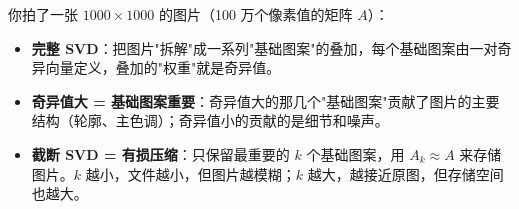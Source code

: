 \documentclass[a4paper,11pt]{ctexart}
\begin{document}
\begin{metaphorbox}
    你拍了一张 $1000 \times 1000$ 的图片（100 万个像素值的矩阵 $A$）：

    \begin{itemize}
        \item \textbf{完整 SVD}：把图片"拆解"成一系列"基础图案"的叠加，每个基础图案由一对奇异向量定义，叠加的"权重"就是奇异值。
        \item \textbf{奇异值大 = 基础图案重要}：奇异值大的那几个"基础图案"贡献了图片的主要结构（轮廓、主色调）；奇异值小的贡献的是细节和噪声。
        \item \textbf{截断 SVD = 有损压缩}：只保留最重要的 $k$ 个基础图案，用 $A_k \approx A$ 来存储图片。$k$ 越小，文件越小，但图片越模糊；$k$ 越大，越接近原图，但存储空间也越大。
    \end{itemize}
\end{metaphorbox}
\end{document}
